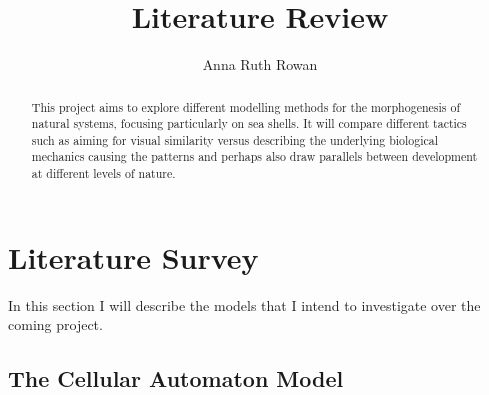 \documentclass[a4paper,11pt]{report}
\title{Literature Review}
\author{Anna Ruth Rowan}
\begin{document}
\maketitle

\tableofcontents

\begin{abstract}
This project aims to explore different modelling methods for the morphogenesis of natural systems, focusing particularly on sea shells. It will compare different tactics such as aiming for visual similarity versus describing the underlying biological mechanics causing the patterns and perhaps also draw parallels between development at different levels of nature.
\end{abstract}




\chapter{Literature Survey}

In this section I will describe the models that I intend to investigate over the coming project.

\section{The Cellular Automaton Model}
\end{document}
